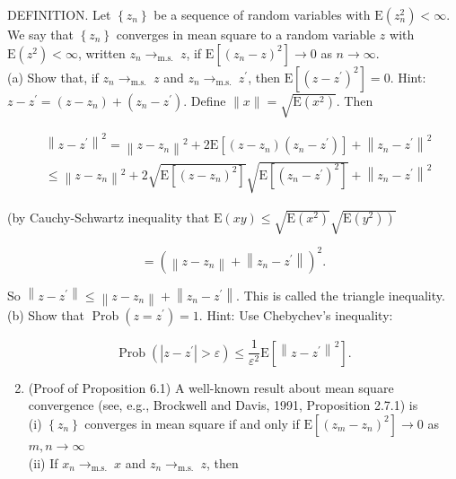 \documentclass[10pt]{article}
\begin{document}
DEFINITION. Let $\left\{z_{n}\right\}$ be a sequence of random variables with $\mathrm{E}\left(z_{n}^{2}\right)<\infty$. We say that $\left\{z_{n}\right\}$ converges in mean square to a random variable $z$ with $\mathrm{E}\left(z^{2}\right)< \infty$, written $z_{n} \rightarrow_{\text {m.s. }} z$, if $\mathrm{E}\left[\left(z_{n}-z\right)^{2}\right] \rightarrow 0$ as $n \rightarrow \infty$.\\
(a) Show that, if $z_{n} \rightarrow_{\text {m.s. }} z$ and $z_{n} \rightarrow_{\text {m.s. }} z^{\prime}$, then $\mathrm{E}\left[\left(z-z^{\prime}\right)^{2}\right]=0$. Hint: $z-z^{\prime}=\left(z-z_{n}\right)+\left(z_{n}-z^{\prime}\right)$. Define $\|x\|=\sqrt{\mathrm{E}\left(x^{2}\right)}$. Then

$$
\begin{aligned}
& \left\|z-z^{\prime}\right\|^{2}=\left\|z-z_{n}\right\|^{2}+2 \mathrm{E}\left[\left(z-z_{n}\right)\left(z_{n}-z^{\prime}\right)\right]+\left\|z_{n}-z^{\prime}\right\|^{2} \\
& \leq\left\|z-z_{n}\right\|^{2}+2 \sqrt{\mathrm{E}\left[\left(z-z_{n}\right)^{2}\right]} \sqrt{\mathrm{E}\left[\left(z_{n}-z^{\prime}\right)^{2}\right]}+\left\|z_{n}-z^{\prime}\right\|^{2}
\end{aligned}
$$

(by Cauchy-Schwartz inequality that $\mathrm{E}(x y) \leq \sqrt{\mathrm{E}\left(x^{2}\right)} \sqrt{\left.\mathrm{E}\left(y^{2}\right)\right)}$

$$
=\left(\left\|z-z_{n}\right\|+\left\|z_{n}-z^{\prime}\right\|\right)^{2} .
$$

So $\left\|z-z^{\prime}\right\| \leq\left\|z-z_{n}\right\|+\left\|z_{n}-z^{\prime}\right\|$. This is called the triangle inequality.\\
(b) Show that $\operatorname{Prob}\left(z=z^{\prime}\right)=1$. Hint: Use Chebychev's inequality:

$$
\operatorname{Prob}\left(\left|z-z^{\prime}\right|>\varepsilon\right) \leq \frac{1}{\varepsilon^{2}} \mathrm{E}\left[\left\|z-z^{\prime}\right\|^{2}\right] .
$$

\begin{enumerate}
  \setcounter{enumi}{1}
  \item (Proof of Proposition 6.1) A well-known result about mean square convergence (see, e.g., Brockwell and Davis, 1991, Proposition 2.7.1) is\\
(i) $\left\{z_{n}\right\}$ converges in mean square if and only if $\mathrm{E}\left[\left(z_{m}-z_{n}\right)^{2}\right] \rightarrow 0$ as $m, n \rightarrow \infty$\\
(ii) If $x_{n} \rightarrow_{\text {m.s. }} x$ and $z_{n} \rightarrow_{\text {m.s. }} z$, then
\end{enumerate}
\end{document}
